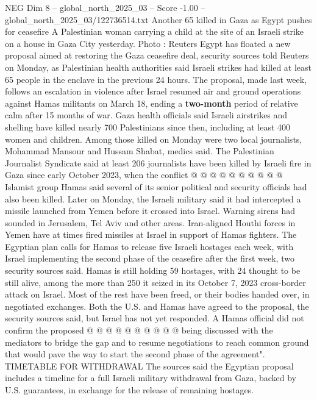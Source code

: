 \begin{textsample}{NEG Dim 8 – global\_north\_2025\_03 – Score -1.00 – global\_north\_2025\_03/122736514.txt}  \label{ex:f8_neg_130}
Another 65 killed in Gaza as Egypt pushes for ceasefire A Palestinian woman carrying a child at the site of an Israeli strike on a house in Gaza City yesterday.
Photo : Reuters Egypt has floated a new proposal aimed at restoring the Gaza ceasefire deal, security sources told Reuters on Monday, as Palestinian health authorities said Israeli strikes had killed at least 65 people in the enclave in the previous 24 hours.
The proposal, made last week, follows an escalation in violence after Israel resumed air and ground operations against Hamas militants on March 18, ending a \textbf{two-month} period of relative calm after 15 months of war.
Gaza health officials said Israeli airstrikes and shelling have killed nearly 700 Palestinians since then, including at least 400 women and children.
Among those killed on Monday were two local journalists, Mohammad Mansour and Hussam Shabat, medics said.
The Palestinian Journalist Syndicate said at least 206 journalists have been killed by Israeli fire in Gaza since early October 2023, when the conflict @ @ @ @ @ @ @ @ @ @ Islamist group Hamas said several of its senior political and security officials had also been killed.
Later on Monday, the Israeli military said it had intercepted a missile launched from Yemen before it crossed into Israel.
Warning sirens had sounded in Jerusalem, Tel Aviv and other areas.
Iran-aligned Houthi forces in Yemen have at times fired missiles at Israel in support of Hamas fighters.
The Egyptian plan calls for Hamas to release five Israeli hostages each week, with Israel implementing the second phase of the ceasefire after the first week, two security sources said.
Hamas is still holding 59 hostages, with 24 thought to be still alive, among the more than 250 it seized in its October 7, 2023 cross-border attack on Israel.
Most of the rest have been freed, or their bodies handed over, in negotiated exchanges.
Both the U.S. and Hamas have agreed to the proposal, the security sources said, but Israel has not yet responded.
A Hamas official did not confirm the proposed @ @ @ @ @ @ @ @ @ @ being discussed with the mediators to bridge the gap and to resume negotiations to reach common ground that would pave the way to start the second phase of the agreement".
TIMETABLE FOR WITHDRAWAL The sources said the Egyptian proposal includes a timeline for a full Israeli military withdrawal from Gaza, backed by U.S. guarantees, in exchange for the release of remaining hostages.

\end{textsample}
